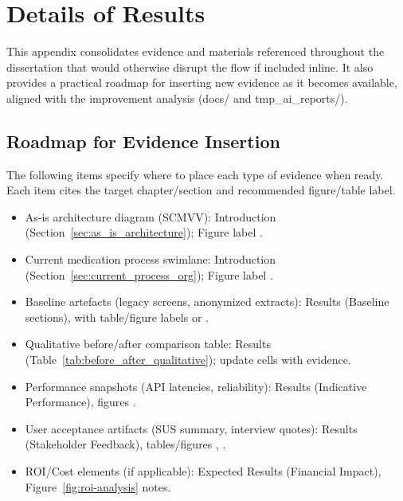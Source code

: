 \chapter{Details of Results}
\label{app:details_results}

This appendix consolidates evidence and materials referenced throughout the dissertation that would otherwise disrupt the flow if included inline. It also provides a practical roadmap for inserting new evidence as it becomes available, aligned with the improvement analysis (docs/ and tmp\_ai\_reports/).

\section{Roadmap for Evidence Insertion}
The following items specify where to place each type of evidence when ready. Each item cites the target chapter/section and recommended figure/table label.
\begin{itemize}
    \item As-is architecture diagram (SCMVV): Introduction (Section~\ref{sec:as_is_architecture}); Figure label \texttt{}.
    \item Current medication process swimlane: Introduction (Section~\ref{sec:current_process_org}); Figure label \texttt{}.
    \item Baseline artefacts (legacy screens, anonymized extracts): Results (Baseline sections), with table/figure labels \texttt{} or \texttt{}.
    \item Qualitative before/after comparison table: Results (Table~\ref{tab:before_after_qualitative}); update cells with evidence.
    \item Performance snapshots (API latencies, reliability): Results (Indicative Performance), figures \texttt{}.
    \item User acceptance artifacts (SUS summary, interview quotes): Results (Stakeholder Feedback), tables/figures \texttt{}, \texttt{}.
    \item ROI/Cost elements (if applicable): Expected Results (Financial Impact), Figure~\ref{fig:roi-analysis} notes.
\end{itemize}


